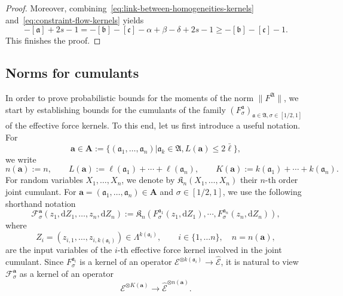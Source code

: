 \documentclass{article}
\numberwithin{equation}{section}
\newcommand{\assign}{:=}
\newcommand{\mathd}{\mathrm{d}}
\theoremstyle{plain}
\theoremstyle{definition}
\begin{document}
\begin{proof}
  Moreover, combining~\eqref{eq:link-between-homogeneities-kernels}
  and~\eqref{eq:constraint-flow-kernels} yields
  \[ - [\mathfrak{a}] + 2 s - 1 = - [\mathfrak{b}] - [\mathfrak{c}] - \alpha +
     \beta - \delta + 2 s - 1 \geqslant - [\mathfrak{b}] - [\mathfrak{c}] - 1.
  \]
  This finishes the proof.
\end{proof}

\subsection{Norms for cumulants}

In order to prove probabilistic bounds for the moments of the norm $\|
F^{\mathfrak{A}} \|$, we start by establishing bounds for the cumulants of the
family $(F_{\sigma}^{\mathfrak{a}})_{\mathfrak{a} \in \mathfrak{A}, \sigma \in
[1 / 2, 1]}$ of the effective force kernels. To this end, let us first
introduce a useful notation. For
\[ \boldsymbol{a} \in \boldsymbol{A} \assign \{ (\mathfrak{a}_1, \ldots,
   \mathfrak{a}_n) | \mathfrak{a}_k \in \mathfrak{A}, L (\boldsymbol{a})
   \leqslant 2 \bar{\ell} \}, \]
we write
\[ n (\boldsymbol{a}) \assign n, \qquad L (\boldsymbol{a}) \assign \ell
   (\mathfrak{a}_1) + \cdots + \ell (\mathfrak{a}_n), \qquad K (\boldsymbol{a})
   \assign k (\mathfrak{a}_1) + \cdots + k (\mathfrak{a}_n) . \]
For random variables $X_1, \ldots, X_n$, we denote by
$\mathfrak{K}_n (X_1, \ldots, X_n)$ their $n$-th order joint cumulant. For
$\boldsymbol{a}= (\mathfrak{a}_1, \ldots, \mathfrak{a}_n) \in \boldsymbol{A}$ and
$\sigma \in [1 / 2, 1]$, we use the following shorthand notation
\[ \mathcal{F}_{\sigma}^{\boldsymbol{a}} (z_1, \mathd Z_1, \ldots, z_n, \mathd
   Z_n) \assign \mathfrak{K}_n (F_{\sigma}^{\mathfrak{a}_1} (z_1, \mathd Z_1),
   \cdots, F_{\sigma}^{\mathfrak{a}_n} (z_n, \mathd Z_n)), \]
where
\begin{equation}
  Z_i = (z_{i, 1}, \ldots, z_{i, k (\mathfrak{a}_i)}) {\in \Lambda^{k
  (\mathfrak{a}_i)}} , \qquad i \in \{ 1, \ldots n \}, \quad n = n
  (\boldsymbol{a}), \label{eq:notation-Z}
\end{equation}
are the input variables of the $i$-th effective force kernel involved in the
joint cumulant. Since $F_{\sigma}^{\mathfrak{a}_i}$ is a kernel of an operator
$\mathcal{E}^{\otimes k (\mathfrak{a}_i)} \rightarrow \hat{\mathcal{E}}$, it
is natural to view $\mathcal{F}_{\sigma}^{\boldsymbol{a}}$ as a kernel of an
operator
\begin{equation}
  \mathcal{E}^{\otimes K (\boldsymbol{a})} \rightarrow
  \hat{\mathcal{E}}^{\otimes n (\boldsymbol{a})} . \label{eq:operator-cumulant}
\end{equation}
\end{document}
